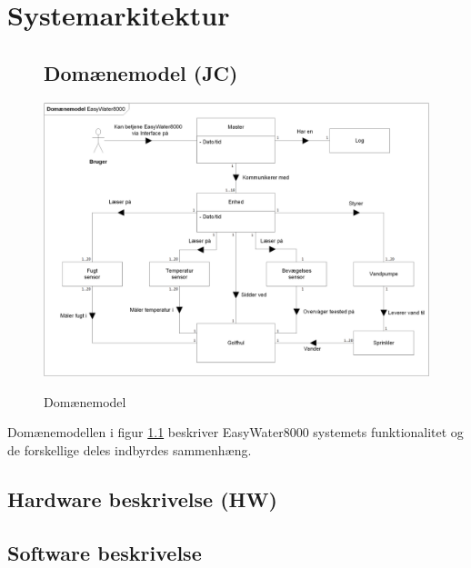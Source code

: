 \chapter{Systemarkitektur}

\begin{figure}[htbp] \centering
\section{Domænemodel (JC)}
{\includegraphics[width=\textwidth]{filer/systemarkitektur/Domainmodel}}
\caption{Domænemodel}
\label{lab:domainmodel}
\end{figure}
Domænemodellen i figur \ref{lab:domainmodel} beskriver EasyWater8000 systemets funktionalitet og de forskellige deles indbyrdes sammenhæng. 

\newpage
\section{Hardware beskrivelse (HW)}


\clearpage
\section{Software beskrivelse}
